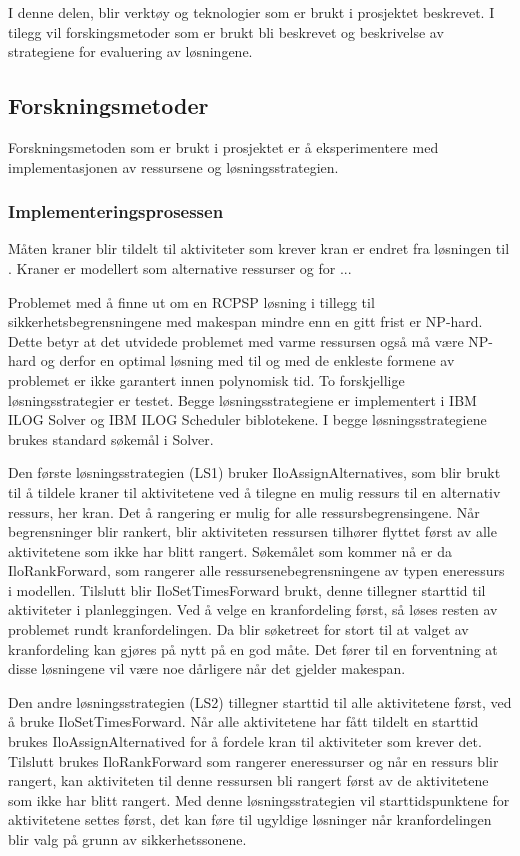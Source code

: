 I denne delen, blir verktøy og teknologier som er brukt i prosjektet beskrevet. I tilegg vil forskingsmetoder som er brukt bli beskrevet og beskrivelse av strategiene for evaluering av løsningene.

\subsection{Forskningsmetoder}
Forskningsmetoden som er brukt i prosjektet er å eksperimentere med implementasjonen av ressursene og løsningsstrategien.

\subsubsection{Implementeringsprosessen}
\label{sec:implprocess}
Måten kraner blir tildelt til aktiviteter som krever kran er endret fra løsningen til \bht. Kraner er modellert som alternative ressurser og for ...

Problemet med å finne ut om en RCPSP løsning i tillegg til sikkerhetsbegrensningene med makespan mindre enn en gitt frist er NP-hard. Dette betyr at det utvidede problemet med varme ressursen også må være NP-hard og derfor en optimal løsning med til og med de enkleste formene av problemet er ikke garantert innen polynomisk tid. To forskjellige løsningsstrategier er testet. Begge løsningsstrategiene er implementert i IBM ILOG Solver og IBM ILOG Scheduler biblotekene. I begge løsningsstrategiene brukes standard søkemål i Solver.

Den første løsningsstrategien (LS1) bruker IloAssignAlternatives, som blir brukt til å tildele kraner til aktivitetene ved å tilegne en mulig ressurs til en alternativ ressurs, her kran. Det å rangering er mulig for alle ressursbegrensingene. Når begrensninger blir rankert, blir aktiviteten ressursen tilhører flyttet først av alle aktivitetene som ikke har blitt rangert. Søkemålet som kommer nå er da IloRankForward, som rangerer alle ressursenebegrensningene av typen eneressurs i modellen. Tilslutt blir IloSetTimesForward brukt, denne tillegner starttid til aktiviteter i planleggingen. Ved å velge en kranfordeling først, så løses resten av problemet rundt kranfordelingen. Da blir søketreet for stort til at valget av kranfordeling kan gjøres på nytt på en god måte. Det fører til en forventning at disse løsningene vil være noe dårligere når det gjelder makespan.

Den andre løsningsstrategien (LS2) tillegner starttid til alle aktivitetene først, ved å bruke IloSetTimesForward. Når alle aktivitetene har fått tildelt en starttid brukes IloAssignAlternatived for å fordele kran til aktiviteter som krever det. Tilslutt brukes IloRankForward som rangerer eneressurser og når en ressurs blir rangert, kan aktiviteten til denne ressursen bli rangert først av de aktivitetene som ikke har blitt rangert. Med denne løsningsstrategien vil starttidspunktene for aktivitetene settes først, det kan føre til ugyldige løsninger når kranfordelingen blir valg på grunn av sikkerhetssonene.

